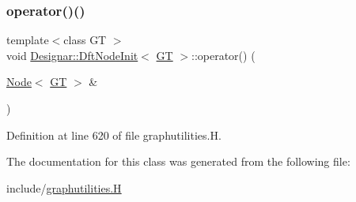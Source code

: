 \subsubsection{\texorpdfstring{operator()()}{operator()()}}
{\footnotesize\ttfamily template$<$class GT $>$ \\
void \hyperlink{class_designar_1_1_dft_node_init}{Designar\+::\+Dft\+Node\+Init}$<$ \hyperlink{demo-buildgraph_8_c_a3001c40d2c31ca87ed96cd7d1334a55e}{GT} $>$\+::operator() (\begin{DoxyParamCaption}\item[{\hyperlink{namespace_designar_a5af326c65aa2bd26b26c410f2030d09e}{Node}$<$ \hyperlink{demo-buildgraph_8_c_a3001c40d2c31ca87ed96cd7d1334a55e}{GT} $>$ \&}]{ }\end{DoxyParamCaption})\hspace{0.3cm}{\ttfamily [inline]}}



Definition at line 620 of file graphutilities.\+H.



The documentation for this class was generated from the following file\+:\begin{DoxyCompactItemize}
\item 
include/\hyperlink{graphutilities_8_h}{graphutilities.\+H}\end{DoxyCompactItemize}
